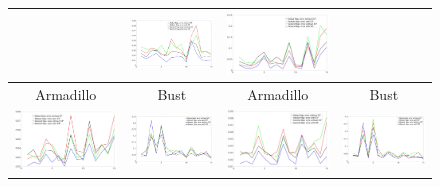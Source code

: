 \documentclass[acmtog,authorversion]{acmart}
\begin{document}
\begin{figure}
\begin{tabular}{cc||cc}
&\includegraphics[width=120pt]{FMAP-images/9-STATISTICS-50.jpg}		%
&\includegraphics[width=120pt]{FMAP-images/10-STATISTICS-50.jpg}\\	%
\hline
Armadillo &Bust &Armadillo &Bust\\
\includegraphics[width=120pt]{FMAP-images/15-STATISTICS-40.jpg}		%
&\includegraphics[width=120pt]{FMAP-images/16-STATISTICS-40.jpg}	%
&\includegraphics[width=120pt]{FMAP-images/15-STATISTICS-50.jpg}	%
&\includegraphics[width=120pt]{FMAP-images/16-STATISTICS-50.jpg}\\	%

\end{tabular}
\end{figure}
\end{document}
